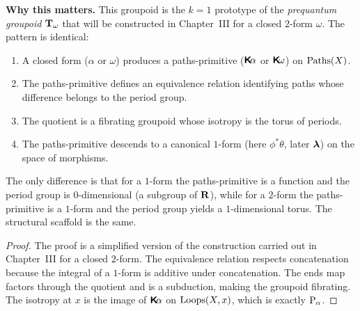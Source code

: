 \documentclass[10pt,reqno,letterpaper,twoside]{amsbook}
\begin{document}
\begin{article}
    \medskip
    \noindent
    \textbf{Why this matters.}
    This groupoid is the $k=1$ prototype of the \emph{prequantum groupoid}
    $\mathbf{T}_\omega$ that will be constructed in Chapter~III for a closed $2$-form
    $\omega$.
    The pattern is identical:
    \begin{enumerate}
      \item A closed form ($\alpha$ or $\omega$) produces a paths-primitive
      ($\boldsymbol{\mathsf{K}}\!\alpha$ or $\boldsymbol{\mathsf{K}}\!\omega$) on $\operatorname{Paths}(X)$.
      \item The paths-primitive defines an equivalence relation identifying
      paths whose difference belongs to the period group.
      \item The quotient is a fibrating groupoid whose isotropy is the
      torus of periods.
      \item The paths-primitive descends to a canonical $1$-form
      (here $\phi^*\theta$, later $\boldsymbol \lambda$) on the space of morphisms.
    \end{enumerate}
    The only difference is that for a $1$-form the paths-primitive is a function
    and the period group is $0$-dimensional (a subgroup of ${\mathbf{R}}$),
    while for a $2$-form the paths-primitive is a $1$-form and the period
    group yields a $1$-dimensional torus.
    The structural scaffold is the same.
  \end{article}
  
  \begin{proof}
    The proof is a simplified version of the construction carried out
    in Chapter~III for a closed $2$-form.
    The equivalence relation respects concatenation because
    the integral of a $1$-form is additive under concatenation.
    The ends map factors through the quotient and is a subduction,
    making the groupoid fibrating.
    The isotropy at $x$ is the image of $\boldsymbol{\mathsf{K}}\!\alpha$ on $\operatorname{Loops}(X,x)$,
    which is exactly $\operatorname{P}_\alpha$.
  \end{proof}
  
\end{document}
